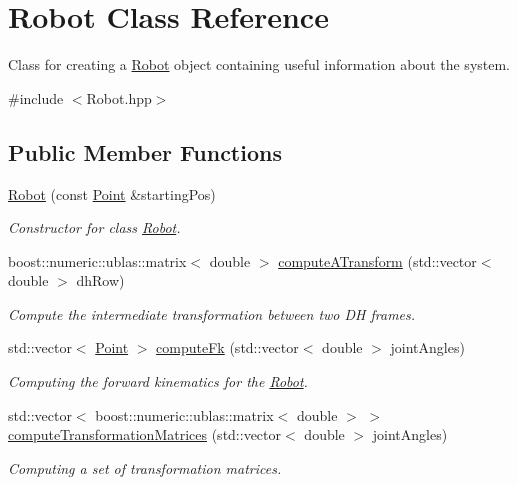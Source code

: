 \hypertarget{classRobot}{}\section{Robot Class Reference}
\label{classRobot}


Class for creating a \hyperlink{classRobot}{Robot} object containing useful information about the system.  




{\ttfamily \#include $<$Robot.\+hpp$>$}

\subsection*{Public Member Functions}
\begin{DoxyCompactItemize}
\item 
\hyperlink{classRobot_a7af51d6234664963ca4abc6cab119f25}{Robot} (const \hyperlink{classPoint}{Point} \&starting\+Pos)
\begin{DoxyCompactList}\small\item\em Constructor for class \hyperlink{classRobot}{Robot}. \end{DoxyCompactList}\item 
boost\+::numeric\+::ublas\+::matrix$<$ double $>$ \hyperlink{classRobot_a3a05c417c60d0debe793049a5e79173c}{compute\+A\+Transform} (std\+::vector$<$ double $>$ dh\+Row)
\begin{DoxyCompactList}\small\item\em Compute the intermediate transformation between two DH frames. \end{DoxyCompactList}\item 
std\+::vector$<$ \hyperlink{classPoint}{Point} $>$ \hyperlink{classRobot_ab171faaa3b20c6fa42d873f5b948fa9e}{compute\+Fk} (std\+::vector$<$ double $>$ joint\+Angles)
\begin{DoxyCompactList}\small\item\em Computing the forward kinematics for the \hyperlink{classRobot}{Robot}. \end{DoxyCompactList}\item 
std\+::vector$<$ boost\+::numeric\+::ublas\+::matrix$<$ double $>$ $>$ \hyperlink{classRobot_af1f293a6bf4e62d6511f64375e4ae632}{compute\+Transformation\+Matrices} (std\+::vector$<$ double $>$ joint\+Angles)
\begin{DoxyCompactList}\small\item\em Computing a set of transformation matrices. \end{DoxyCompactList}\item 

\end{DoxyCompactItemize}
